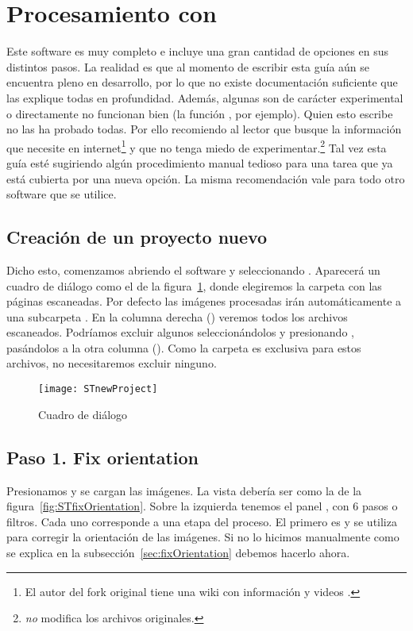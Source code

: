 \documentclass[%
	a5paper,
	10pt,
	twoside,
	openright,
	final,
]{memoir}
\begin{document}
{	

	\section{Procesamiento con \scantailor} Este software es muy completo e incluye una gran cantidad de opciones en sus distintos pasos. La realidad es que al momento de escribir esta guía aún se encuentra pleno en desarrollo, por lo que no existe documentación suficiente que las explique todas en profundidad. Además, algunas son de carácter experimental o directamente no funcionan bien (la función , por ejemplo). Quien esto escribe no las ha probado todas. Por ello recomiendo al lector que busque la información que necesite en internet\footnote{El autor del fork original tiene una wiki con información y videos \cite{ScanTailorWiki}.} y que no tenga miedo de experimentar.\footnote{\scantailor \emph{no} modifica los archivos originales.} Tal vez esta guía esté sugiriendo algún procedimiento manual tedioso para una tarea que ya está cubierta por una nueva opción. La misma recomendación vale para todo otro software que se utilice.

	\subsection{Creación de un proyecto nuevo} Dicho esto, comenzamos abriendo el software y seleccionando . Aparecerá un cuadro de diálogo como el de la figura~\ref{fig:STnewProject}, donde elegiremos la carpeta con las páginas escaneadas. Por defecto las imágenes procesadas irán automáticamente a una subcarpeta . En la columna derecha () veremos todos los archivos escaneados. Podríamos excluir algunos seleccionándolos y presionando , pasándolos a la otra columna (). Como la carpeta  es exclusiva para estos archivos, no necesitaremos excluir ninguno.

	\begin{figure}
		\centering
		\texttt{[image: STnewProject]}
		\caption[Cuadro de diálogo \texttt{New Project} de \scantailor]{Cuadro de diálogo \label{fig:STnewProject}}
	\end{figure}

	\subsection{Paso 1. Fix orientation\label{sec:STfixOrientation}} Presionamos  y se cargan las imágenes. La vista debería ser como la de la figura~\ref{fig:STfixOrientation}. Sobre la izquierda tenemos el panel , con 6 pasos o filtros. Cada uno corresponde a una etapa del proceso. El primero es  y se utiliza para corregir la orientación de las imágenes. Si no lo hicimos manualmente como se explica en la subsección~\ref{sec:fixOrientation} debemos hacerlo ahora.

}
\end{document}
